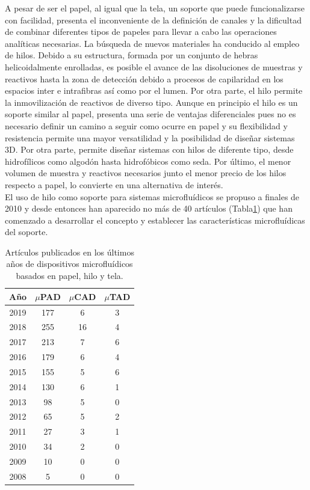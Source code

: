 \documentclass{article}
\begin{document}
A pesar de ser el papel, al igual que la tela, un soporte que puede funcionalizarse con facilidad, presenta el inconveniente de la definición de canales y la dificultad de combinar diferentes tipos de papeles para llevar a cabo las operaciones analíticas necesarias. La búsqueda de nuevos materiales ha conducido al empleo de hilos. Debido a su estructura, formada por un conjunto de hebras helicoidalmente enrolladas, es posible el avance de las disoluciones de muestras y reactivos hasta la zona de detección debido a procesos de capilaridad en los espacios inter e intrafibras así como por el lumen\cite{Banerjee2013}. Por otra parte, el hilo permite la inmovilización de reactivos de diverso tipo\cite{Lu2015}. Aunque en principio el hilo es un soporte similar al papel, presenta una serie de ventajas diferenciales\cite{Nilghaz2013} pues no es necesario definir un camino a seguir como ocurre en papel y su flexibilidad y resistencia permite una mayor versatilidad y la posibilidad de diseñar sistemas 3D. Por otra parte, permite diseñar sistemas con hilos de diferente tipo, desde hidrofílicos como algodón hasta hidrofóbicos como seda. Por último, el menor volumen de muestra y reactivos necesarios junto el menor precio de los hilos respecto a papel, lo convierte en una alternativa de interés.\\

El uso de hilo como soporte para sistemas microfluídicos se propuso a finales de 2010\cite{Li2010} y desde entonces han aparecido no más de 40 artículos (Tabla\ref{tabla:biblio}) que han comenzado a desarrollar el concepto y establecer las características microfluídicas del soporte\cite{Ballerini2011}.
\begin{table}
	\centering
	\caption{Artículos publicados en los últimos años de dispositivos microfluídicos basados en papel, hilo y tela.}
	\label{tabla:biblio}
	
\begin{tabular}{|c|c|c|c|}
	\hline 
	Año & $\mu$PAD & $\mu$CAD & $\mu$TAD \\ 
	\hline 
	2019 & 177 & 6 & 3 \\ 
	\hline 
	2018 & 255 & 16 & 4 \\ 
	\hline 
	2017 & 213 & 7 & 6 \\ 
	\hline 
	2016 & 179 & 6 & 4 \\ 
	\hline 
	2015 & 155 & 5 & 6 \\ 
	\hline 
	2014 & 130 & 6 & 1 \\ 
	\hline 
	2013 & 98 & 5 & 0 \\ 
	\hline 
	2012 & 65 & 5 & 2 \\ 
	\hline 
	2011 & 27 & 3 & 1 \\ 
	\hline 
	2010 & 34 & 2 & 0 \\ 
	\hline 
	2009 & 10 & 0 & 0 \\ 
	\hline 
	2008 & 5 & 0 & 0 \\ 
	\hline 
\end{tabular} 
\end{table}
\end{document}
